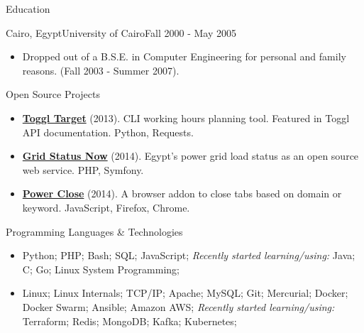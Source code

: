 \documentclass[]{mosabcv}
\begin{document}
    \begin{cvsection}{Education}
        \begin{cvsubsection}{Cairo, Egypt}{University of Cairo}{Fall 2000 - May 2005}
            \begin{itemize}
                \item Dropped out of a B.S.E. in Computer Engineering for personal and family reasons. (Fall 2003 - Summer 2007).
            \end{itemize}
        \end{cvsubsection}
    \end{cvsection}
    
    \begin{cvsection}{Open Source Projects}
        \begin{cvsubsection}{}{}{}
            \begin{itemize}
                \item \textbf{\href{https://github.com/mos3abof/toggl_target}{Toggl Target}} (2013). CLI working hours planning tool. Featured in Toggl API documentation. Python, Requests.
                \item \textbf{\href{https://www.gridstatusnow.com}{Grid Status Now}} (2014). Egypt's power grid load status as an open source web service. PHP, Symfony.
                \item \textbf{\href{https://power-close.com/}{Power Close}} (2014). A browser addon to close tabs based on domain or keyword. JavaScript, Firefox, Chrome.
            \end{itemize}
        \end{cvsubsection}
    \end{cvsection}
    
    \begin{cvsection}{Programming Languages \& Technologies}
        \begin{cvsubsection}{}{}{}
            \begin{itemize}
                \item Python; PHP; Bash; SQL; JavaScript; \textit{Recently started learning/using:} Java; C; Go; Linux System Programming;
                \item Linux; Linux Internals; TCP/IP; Apache; MySQL; Git; Mercurial; Docker; Docker Swarm; Ansible; Amazon AWS; \textit{Recently started learning/using:} Terraform; Redis; MongoDB; Kafka; Kubernetes;
            \end{itemize}
        \end{cvsubsection}
    \end{cvsection}
    
\end{document}
